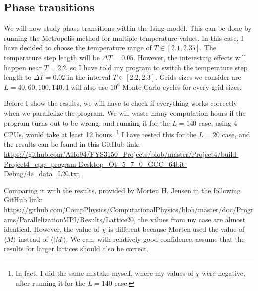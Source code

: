 \documentclass[12pt]{article}
\begin{document}
\subsection{Phase transitions}
We will now study phase transitions within the Ising model. This can be done by running the Metropolis method for multiple temperature values. In this case, I have decided to choose the temperature range of $T\in [2.1, 2.35]$. The temperature step length will be $\Delta T = 0.05$. However, the interesting effects will happen near $T=2.2$, so I have told my program to switch the temperature step length to $\Delta T = 0.02$ in the interval $T\in[2.2,2.3]$. Grids sizes we consider are $L=40,60,100,140$. I will also use $10^6$ Monte Carlo cycles for every grid sizes.

Before I show the results, we will have to check if everything works correctly when we parallelize the program. We will waste many computation hours if the program turns out to be wrong, and running it for the $L=140$ case, using 4 CPUs, would take at least 12 hours. \footnote{In fact, I did the same mistake myself, where my values of $\chi$ were negative, after running it for the $L=140$ case.} I have tested this for the $L=20$ case, and the results can be found in this GitHub link:
 \url{https://github.com/AHo94/FYS3150_Projects/blob/master/Project4/build-Project4_cpp_program-Desktop_Qt_5_7_0_GCC_64bit-Debug/4e_data_L20.txt}

Comparing it with the results, provided by Morten H. Jensen in the following GitHub link: 
\url{https://github.com/CompPhysics/ComputationalPhysics/blob/master/doc/Programs/ParallelizationMPI/Results/Lattice20}, the values from my case are almost identical. However, the value of $\chi$ is different because Morten used the value of $\langle M \rangle$ instead of $\langle |M| \rangle$. We can, with relatively good confidence, assume that the results for larger lattices should also be correct.
\end{document}
